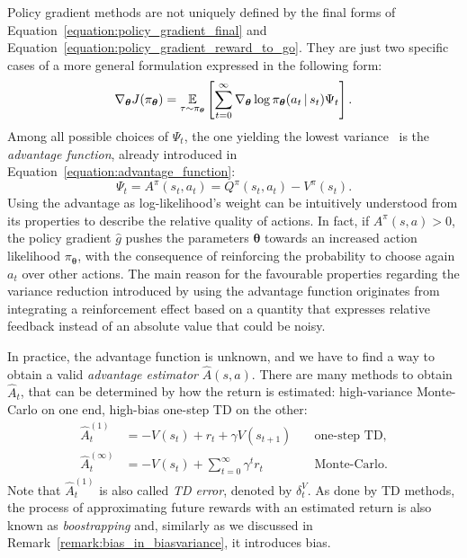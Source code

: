 Policy gradient methods are not uniquely defined by the final forms of Equation~\eqref{equation:policy_gradient_final} and Equation~\eqref{equation:policy_gradient_reward_to_go}.
They are just two specific cases of a more general formulation expressed in the following form:
%
\begin{equation}
    \label{equation:policy_gradient_generic}
    \nabla_{\boldsymbol{\theta}} J(\pi_{\boldsymbol{\theta}})
    = \operatorname*{\mathbb{E}}_{\tau \sim \pi_{\boldsymbol{\theta}}} \left[ \sum_{t=0}^{\infty} \nabla_{\boldsymbol{\theta}} \log \pi_{\boldsymbol{\theta}}(a_t \operatorname{\mid} s_t) \Psi_t \right] .
\end{equation}
%
Among all possible choices of $\Psi_t$, the one yielding the lowest variance~\parencite{schulman_high-dimensional_2018} is the \emph{advantage function}, already introduced in Equation~\eqref{equation:advantage_function}:
%
\begin{equation*}
    \Psi_t = A^\pi(s_t, a_t) = Q^\pi(s_t, a_t) - V^\pi(s_t) .
\end{equation*}
%
Using the advantage as log-likelihood's weight can be intuitively understood from its properties to describe the relative quality of actions.
In fact, if $A^\pi(s, a) > 0$, the policy gradient $\hat{g}$ pushes the parameters $\boldsymbol{\theta}$ towards an increased action likelihood $\pi_{\boldsymbol{\theta}}$, with the consequence of reinforcing the probability to choose again $a_t$ over other actions.
%
The main reason for the favourable properties regarding the variance reduction introduced by using the advantage function originates from integrating a reinforcement effect based on a quantity that expresses relative feedback instead of an absolute value that could be noisy.

In practice, the advantage function is unknown, and we have to find a way to obtain a valid \emph{advantage estimator} $\hat{A}(s, a)$.
There are many methods to obtain $\hat{A}_t$, that can be determined by how the return is estimated: high-variance Monte-Carlo on one end, high-bias one-step TD on the other:
%
\begin{align*}
    \hat{A}_t^{(1)} &= -V(s_t) + r_t + \gamma V(s_{t+1}) \quad& \text{one-step TD}, \\
    \hat{A}_t^{(\infty)} &= -V(s_t) + \sum_{t=0}^{\infty} \gamma^t r_t \quad& \text{Monte-Carlo}.
\end{align*}
%
Note that $\hat{A}_t^{(1)}$ is also called \emph{TD error}, denoted by $\delta_t^V$.
As done by TD methods, the process of approximating future rewards with an estimated return is also known as \emph{boostrapping} and, similarly as we discussed in Remark~\ref{remark:bias_in_biasvariance}, it introduces bias.


